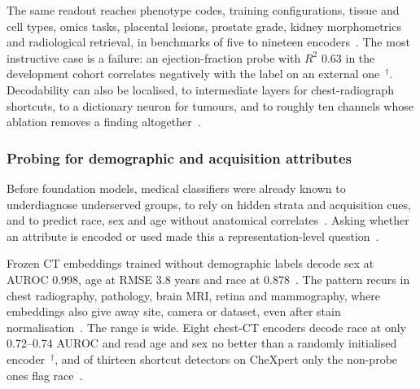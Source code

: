 The same readout reaches phenotype codes, training configurations, tissue and cell types, omics tasks,
placental lesions, prostate grade, kidney morphometrics and radiological retrieval, in benchmarks of
five to nineteen
encoders~\cite{lin2026transparent,liang2026cheap,demir2025downstream,cui2026translating,hu2026probing,jamzad2026p3ca,sadman2025interpreting,svatko2026deep,jung2026foundation,steiner2026when,vadori2025mind,bakhta2026frozen,beyeler2024comparing,peng2025benchmarking,gustafsson2024evaluating,kasireddy2025explainable,denner2024leveraging,howard2024generative,ramchandani2026benchmarking,zhao2026benchmarking}.
The most instructive case is a failure: an ejection-fraction probe with $R^2$ 0.63 in the development
cohort correlates negatively with the label on an external one~\cite{akanova2026interpreting}$^{\dagger}$.
Decodability can also be localised, to intermediate layers for chest-radiograph shortcuts, to a
dictionary neuron for tumours, and to roughly ten channels whose ablation removes a finding
altogether~\cite{pedersen2026look,tamura2025patch,nooralahzadeh2026sparse,goetze2025prediction,basu2026interpretability,nooralahzadeh2026arbitration}.

\subsubsection{Probing for demographic and acquisition attributes}

Before foundation models, medical classifiers were already known to underdiagnose underserved groups,
to rely on hidden strata and acquisition cues, and to predict race, sex and age without anatomical
correlates~\cite{seyyedkalantari2021underdiagnosis,oakdenrayner2019hidden,degrave2020ai,banerjee2021ai,adleberg2022predicting,korot2021predicting,coyner2021color,burns2023ability,vaidya2024demographic,jones2024causal}.
Asking whether an attribute is encoded or used made this a representation-level
question~\cite{glocker2023algorithmic,glocker2022risk}.

Frozen CT embeddings trained without demographic labels decode sex at AUROC 0.998, age at RMSE 3.8 years
and race at 0.878~\cite{zheng2024demographic}. The pattern recurs in chest radiography, pathology, brain
MRI, retina and mammography, where embeddings also give away site, camera or dataset, even after stain
normalisation~\cite{sourget2025fairness,dejong2025current,komen2024do,rahbar2026frozen,li2026acquisition,hajishafiezahramini2026dataset,encin2026comparative,lin2025beyond,kmen2026robust}.
The range is wide. Eight chest-CT encoders decode race at only 0.72--0.74 AUROC and read age and sex no
better than a randomly initialised encoder~\cite{tariq2024self}$^{\dagger}$, and of thirteen shortcut
detectors on CheXpert only the non-probe ones flag race~\cite{cajas2026shortkit}.


